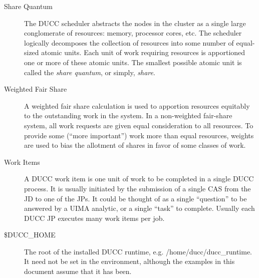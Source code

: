 \begin{description}
\item[Share Quantum] The DUCC scheduler abstracts the nodes in the cluster as a single large
  conglomerate of resources: memory, processor cores, etc.  The scheduler logically decomposes 
  the collection of resources into some number of equal-sized atomic units.  Each unit of work requiring
  resources is apportioned one or more of these atomic units.  The smallest possible atomic 
  unit is called the {\em share quantum}, or simply, {\em share}.

\item[Weighted Fair Share] A weighted fair share calculation is used to apportion resources
  equitably to the outstanding work in the system.  In a non-weighted fair-share system, all
  work requests are given equal consideration to all resources.  To provide some (``more important'')
  work more than equal resources, weights are used to bias the allotment of shares in favor of
  some classes of work.

\item[Work Items] A DUCC work item is one unit of work to be completed in a single DUCC process. It
  is usually initiated by the submission of a single CAS from the JD to one of the JPs. It could be
  thought of as a single ``question'' to be answered by a UIMA analytic, or a single ``task'' to
  complete. Usually each DUCC JP executes many work items per job.

\item[\$DUCC\_HOME] The root of the installed DUCC runtime, e.g. /home/ducc/ducc\_runtime.  
  It need not be set in the environment, although the examples in this document assume that it has been.

\end{description}



